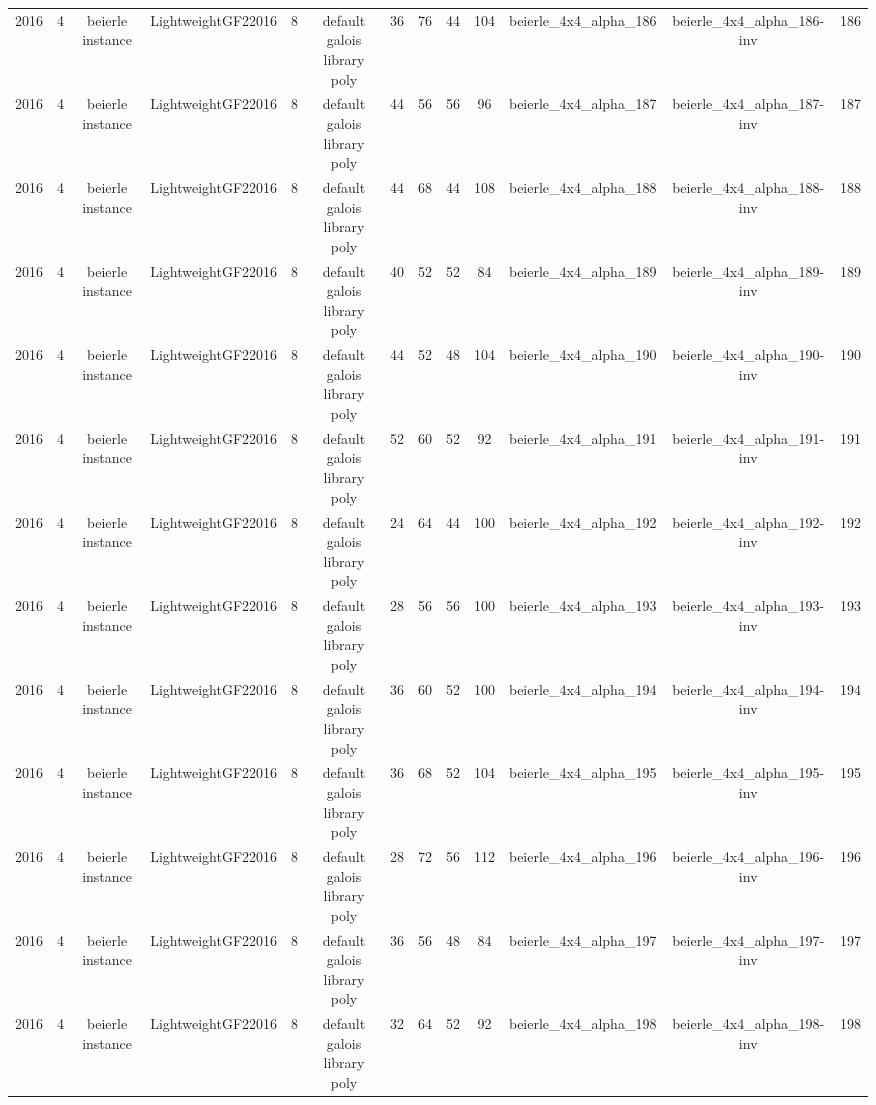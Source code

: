 \begin{tabular}{c c c c c c c c c c c c c}
2016 & 4 & beierle instance & LightweightGF22016 & 8 & default galois library poly & 36 & 76 & 44 & 104 & beierle_4x4_alpha_186 & beierle_4x4_alpha_186-inv & 186 \\
2016 & 4 & beierle instance & LightweightGF22016 & 8 & default galois library poly & 44 & 56 & 56 & 96 & beierle_4x4_alpha_187 & beierle_4x4_alpha_187-inv & 187 \\
2016 & 4 & beierle instance & LightweightGF22016 & 8 & default galois library poly & 44 & 68 & 44 & 108 & beierle_4x4_alpha_188 & beierle_4x4_alpha_188-inv & 188 \\
2016 & 4 & beierle instance & LightweightGF22016 & 8 & default galois library poly & 40 & 52 & 52 & 84 & beierle_4x4_alpha_189 & beierle_4x4_alpha_189-inv & 189 \\
2016 & 4 & beierle instance & LightweightGF22016 & 8 & default galois library poly & 44 & 52 & 48 & 104 & beierle_4x4_alpha_190 & beierle_4x4_alpha_190-inv & 190 \\
2016 & 4 & beierle instance & LightweightGF22016 & 8 & default galois library poly & 52 & 60 & 52 & 92 & beierle_4x4_alpha_191 & beierle_4x4_alpha_191-inv & 191 \\
2016 & 4 & beierle instance & LightweightGF22016 & 8 & default galois library poly & 24 & 64 & 44 & 100 & beierle_4x4_alpha_192 & beierle_4x4_alpha_192-inv & 192 \\
2016 & 4 & beierle instance & LightweightGF22016 & 8 & default galois library poly & 28 & 56 & 56 & 100 & beierle_4x4_alpha_193 & beierle_4x4_alpha_193-inv & 193 \\
2016 & 4 & beierle instance & LightweightGF22016 & 8 & default galois library poly & 36 & 60 & 52 & 100 & beierle_4x4_alpha_194 & beierle_4x4_alpha_194-inv & 194 \\
2016 & 4 & beierle instance & LightweightGF22016 & 8 & default galois library poly & 36 & 68 & 52 & 104 & beierle_4x4_alpha_195 & beierle_4x4_alpha_195-inv & 195 \\
2016 & 4 & beierle instance & LightweightGF22016 & 8 & default galois library poly & 28 & 72 & 56 & 112 & beierle_4x4_alpha_196 & beierle_4x4_alpha_196-inv & 196 \\
2016 & 4 & beierle instance & LightweightGF22016 & 8 & default galois library poly & 36 & 56 & 48 & 84 & beierle_4x4_alpha_197 & beierle_4x4_alpha_197-inv & 197 \\
2016 & 4 & beierle instance & LightweightGF22016 & 8 & default galois library poly & 32 & 64 & 52 & 92 & beierle_4x4_alpha_198 & beierle_4x4_alpha_198-inv & 198 \\

\end{tabular}

